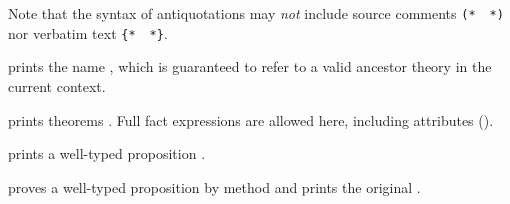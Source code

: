 \begin{isabellebody}
\begin{isamarkuptext}
  Note that the syntax of antiquotations may \emph{not} include source
  comments \verb|(*|~~\verb|*)| nor verbatim
  text \verb|{|\verb|*|~~\verb|*|\verb|}|.

  \begin{description}
  
  \item {} prints the name , which is
  guaranteed to refer to a valid ancestor theory in the current
  context.

  \item {} prints theorems .
  Full fact expressions are allowed here, including attributes
  ().

  \item {} prints a well-typed proposition .

  \item {} proves a well-typed proposition
   by method  and prints the original .


\end{description}
\end{isamarkuptext}
\end{isabellebody}
